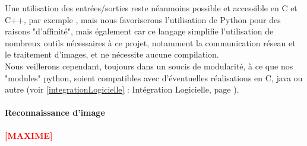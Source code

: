 			Une utilisation des entrées/sorties reste néanmoins possible et accessible en C et C++, par exemple \cite{bib16}, mais nous favoriserons l'utilisation de Python pour des raisons "d'affinité", mais également car ce langage simplifie l'utilisation de nombreux outils nécessaires à ce projet, notamment la communication réseau et le traitement d'images, et ne nécessite aucune compilation.\\

			Nous veillerons cependant, toujours dans un soucis de modularité, à ce que nos "modules" python, soient compatibles avec d'éventuelles réalisations en C, java ou autre (voir \ref{integrationLogicielle} : Intégration Logicielle, page \pageref{integrationLogicielle}).

		\paragraph{Reconnaissance d'image}

				\textbf{\huge{\textcolor{red}{[MAXIME]}}}